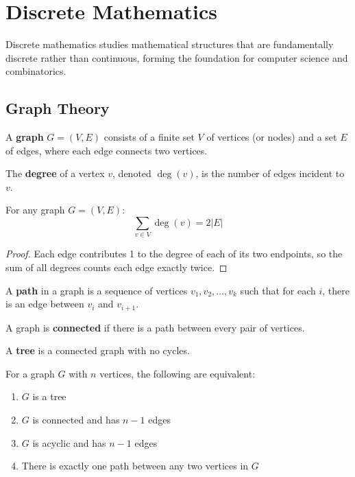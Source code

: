 \chapter{Discrete Mathematics}

Discrete mathematics studies mathematical structures that are fundamentally discrete rather than continuous, forming the foundation for computer science and combinatorics.

\section{Graph Theory}

\begin{definition}[Graph]
A \textbf{graph} $G = (V, E)$ consists of a finite set $V$ of vertices (or nodes) and a set $E$ of edges, where each edge connects two vertices.
\end{definition}

\begin{definition}[Degree]
The \textbf{degree} of a vertex $v$, denoted $\deg(v)$, is the number of edges incident to $v$.
\end{definition}

\begin{theorem}
For any graph $G = (V, E)$:
\[\sum_{v \in V} \deg(v) = 2|E|\]
\end{theorem}

\begin{proof}
Each edge contributes 1 to the degree of each of its two endpoints, so the sum of all degrees counts each edge exactly twice.
\end{proof}

\begin{definition}[Path]
A \textbf{path} in a graph is a sequence of vertices $v_1, v_2, \ldots, v_k$ such that for each $i$, there is an edge between $v_i$ and $v_{i+1}$.
\end{definition}

\begin{definition}
A graph is \textbf{connected} if there is a path between every pair of vertices.
\end{definition}

\begin{definition}[Tree]
A \textbf{tree} is a connected graph with no cycles.
\end{definition}

\begin{theorem}
For a graph $G$ with $n$ vertices, the following are equivalent:
\begin{enumerate}
    \item $G$ is a tree
    \item $G$ is connected and has $n-1$ edges
    \item $G$ is acyclic and has $n-1$ edges
    \item There is exactly one path between any two vertices in $G$
\end{enumerate}
\end{theorem}

